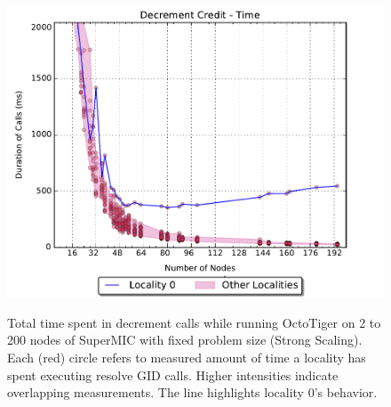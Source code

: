 \begin{figure}[h]
    \centering
    \vspace{2.5cm}
    \caption{Total time spent in decrement calls while running OctoTiger on 2 to 200 nodes of SuperMIC with fixed problem size (Strong Scaling). Each (red) circle refers to measured amount of time a locality has spent executing resolve GID calls. Higher intensities indicate overlapping measurements. The line highlights locality 0's behavior.}
    \includegraphics[width=.67\textwidth,height=\textheight,keepaspectratio]{graphs/octotiger_decrement_credit_time}
    \label{fig:octgr_strong_decr_cred}
\end{figure}


